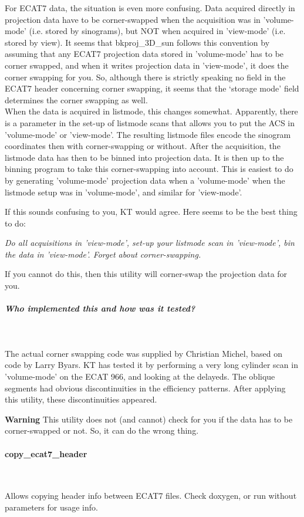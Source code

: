\documentclass{article}
\newcommand{\subsubsubsection}[1]{\paragraph{#1}\mbox{} \\}
\newcommand{\subsubsubsubsection}[1]{\subparagraph{#1} \mbox{} \\}
\begin{document}
{{For ECAT7 data, the situation is even more confusing. Data acquired 
directly in projection data have to be corner-swapped when the 
acquisition was in 'volume-mode' (i.e. stored by sinograms), 
but NOT when acquired in 'view-mode' (i.e. stored by view). It 
seems that bkproj\_3D\_sun follows this convention by assuming 
that any ECAT7 projection data stored in 'volume-mode' has to 
be corner swapped, and when it writes projection data in 'view-mode', 
it does the corner swapping for you. So, although there is strictly 
speaking no field in the ECAT7 header concerning corner swapping, 
it seems that the `storage mode' field determines the corner swapping 
as well.\\
When the data is acquired in listmode, this changes somewhat. 
Apparently, there is a parameter in the set-up of listmode scans 
that allows you to put the ACS in 'volume-mode' or 'view-mode'. 
The resulting listmode files encode the sinogram coordinates 
then with corner-swapping or without. After the acquisition, 
the listmode data has then to be binned into projection data. 
It is then up to the binning program to take this corner-swapping 
into account. This is easiest to do by generating 'volume-mode' 
projection data when a 'volume-mode' when the listmode setup 
was in 'volume-mode', and similar for 'view-mode'.


If this sounds confusing to you, KT would agree. Here seems to 
be the best thing to do:


\textit{Do all acquisitions in 'view-mode', set-up your listmode 
scan in 'view-mode', bin the data in 'view-mode'. Forget about 
corner-swapping.}


If you cannot do this, then this utility will corner-swap the 
projection data for you.

{ \subsubsubsubsection{Who implemented this and how was it tested?}
}
The actual corner swapping code was supplied by Christian Michel, 
based on code by Larry Byars. KT has tested it by performing 
a very long cylinder scan in 'volume-mode' on the ECAT 966, and 
looking at the delayeds. The oblique segments had obvious discontinuities 
in the efficiency patterns. After applying this utility, these 
discontinuities appeared.



\textbf{Warning} This utility does not (and cannot) check for you 
if the data has to be corner-swapped or not. So, it can do the 
wrong thing.

{ \subsubsubsection{copy\_ecat7\_header}
}
Allows copying header info between ECAT7 files. Check doxygen, or run without 
parameters for usage info.

}}
\end{document}
